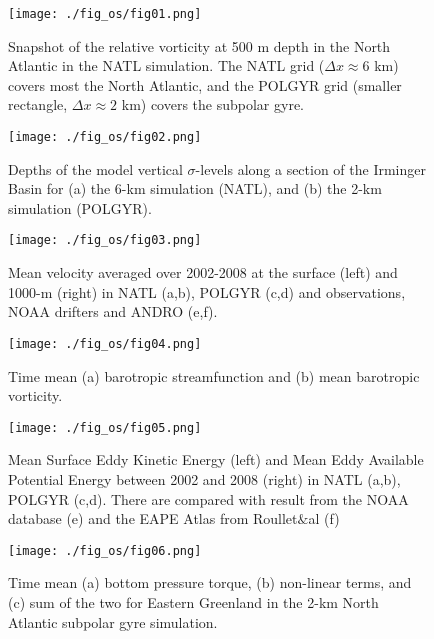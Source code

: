 \documentclass{ametsoc}
\begin{document}
%






\begin{figure}[t]
\centerline{\texttt{[image: ./fig\_os/fig01.png]}}
\caption{Snapshot of the relative vorticity at 500 m depth in the North Atlantic in the NATL simulation. The NATL grid ($\Delta x \approx 6$ km) covers most the North Atlantic, and the POLGYR grid (smaller rectangle, $\Delta x \approx 2$ km) covers the subpolar gyre.}
\label{domain}
\end{figure} 

\begin{figure}[t]
\centerline{\texttt{[image: ./fig\_os/fig02.png]}}
\caption{Depths of the model vertical $\sigma$-levels along a section of the Irminger Basin for (a) the 6-km simulation (NATL), and (b) the 2-km simulation (POLGYR).}
\label{vertical_level}
\end{figure} 

\begin{figure}[t]
\centerline{\texttt{[image: ./fig\_os/fig03.png]}}
\caption{Mean velocity averaged over 2002-2008 at the surface (left) and 1000-m (right) in NATL (a,b), POLGYR (c,d) and observations, NOAA drifters and ANDRO (e,f).}
\label{vel}
\end{figure}

\begin{figure}[t]
\centerline{\texttt{[image: ./fig\_os/fig04.png]}}
\caption{Time mean (a) barotropic streamfunction and (b) mean barotropic vorticity.}
\label{psil}
\end{figure}

\begin{figure}[t]
\centerline{\texttt{[image: ./fig\_os/fig05.png]}}
\caption{Mean Surface Eddy Kinetic Energy (left) and Mean Eddy Available Potential Energy between 2002 and 2008 (right) in NATL (a,b), POLGYR (c,d). There are compared with result from the NOAA database (e) and the EAPE Atlas from Roullet$\&$al (f)}
\label{energy}
\end{figure}

\begin{figure}[t]
\centerline{\texttt{[image: ./fig\_os/fig06.png]}}
\caption{Time mean (a) bottom pressure torque, (b) non-linear terms, and (c) sum of the two for Eastern Greenland in the 2-km North Atlantic subpolar gyre simulation.}
\label{BPT_NL_unsmoothed}
\end{figure} 
\end{document}
